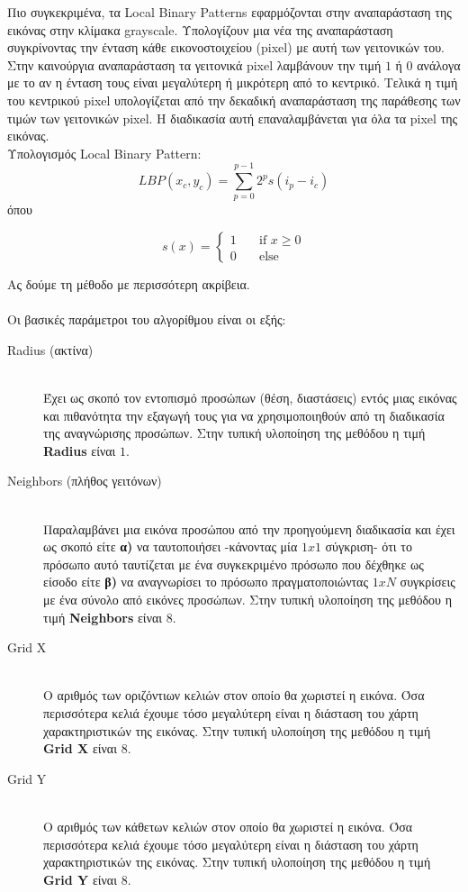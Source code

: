 Πιο συγκεκριμένα, τα Local Binary Patterns εφαρμόζονται στην αναπαράσταση της εικόνας
στην κλίμακα grayscale. Υπολογίζουν μια νέα της αναπαράσταση συγκρίνοντας την ένταση
κάθε εικονοστοιχείου (pixel) με αυτή των γειτονικών του. Στην καινούργια αναπαράσταση
τα γειτονικά pixel λαμβάνουν την τιμή $1$ ή $0$ ανάλογα με το αν η ένταση τους είναι
μεγαλύτερη ή μικρότερη από το κεντρικό. Τελικά η τιμή του κεντρικού pixel υπολογίζεται
από την δεκαδική αναπαράσταση της παράθεσης των τιμών των γειτονικών pixel. Η διαδικασία
αυτή επαναλαμβάνεται για όλα τα pixel της εικόνας.\newline
\\
Υπολογισμός Local Binary Pattern:
$$
LBP(x_c, y_c) = \sum_{p=0}^{p-1}2^ps(i_p-i_c)
$$
όπου

$$ s(x) =
  \begin{cases}
    1       & \quad \text{if } x \geq 0\\
    0       & \quad \text{else}
  \end{cases}
$$

Ας δούμε τη μέθοδο με περισσότερη ακρίβεια.\\
\\
Οι βασικές παράμετροι του αλγορίθμου είναι οι εξής:

\begin{description}
    \item[Radius (ακτίνα)] \hfill \\
    Έχει ως σκοπό τον εντοπισμό προσώπων (θέση, διαστάσεις) εντός μιας εικόνας
    και πιθανότητα την εξαγωγή τους για να χρησιμοποιηθούν από τη διαδικασία της
    αναγνώρισης προσώπων. Στην τυπική υλοποίηση της μεθόδου η τιμή \textbf{Radius} είναι $1$.
    \item[Neighbors (πλήθος γειτόνων)] \hfill \\
    Παραλαμβάνει μια εικόνα προσώπου από την προηγούμενη διαδικασία και έχει ως
    σκοπό είτε \textbf{α)} να ταυτοποιήσει -κάνοντας μία $1x1$ σύγκριση- ότι το
    πρόσωπο αυτό ταυτίζεται με ένα συγκεκριμένο πρόσωπο που δέχθηκε ως είσοδο
    είτε \textbf{β)} να αναγνωρίσει το πρόσωπο πραγματοποιώντας $1xN$ συγκρίσεις
    με ένα σύνολο από εικόνες προσώπων. Στην τυπική υλοποίηση της μεθόδου η τιμή \textbf{Neighbors} είναι $8$.
    \item[Grid X] \hfill \\
    Ο αριθμός των οριζόντιων κελιών στον οποίο θα χωριστεί η εικόνα. Όσα περισσότερα
    κελιά έχουμε τόσο μεγαλύτερη είναι η διάσταση του χάρτη χαρακτηριστικών της εικόνας.
    Στην τυπική υλοποίηση της μεθόδου η τιμή \textbf{Grid X} είναι $8$.
    \item[Grid Y] \hfill \\
    Ο αριθμός των κάθετων κελιών στον οποίο θα χωριστεί η εικόνα. Όσα περισσότερα
    κελιά έχουμε τόσο μεγαλύτερη είναι η διάσταση του χάρτη χαρακτηριστικών της εικόνας.
    Στην τυπική υλοποίηση της μεθόδου η τιμή \textbf{Grid Y} είναι $8$.
\end{description}

